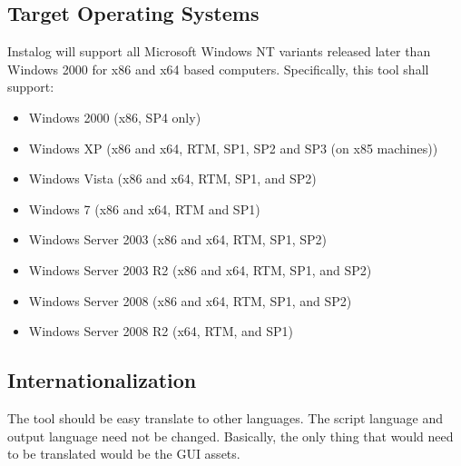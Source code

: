 \documentclass[letterpaper,12pt]{article}
\begin{document}
\subsection{Target Operating Systems}
Instalog will support all Microsoft Windows NT variants released later than
Windows 2000 for x86 and x64 based computers.  Specifically, this tool shall
support:
\begin{itemize}
  \item Windows 2000 (x86, SP4 only)
  \item Windows XP (x86 and x64, RTM, SP1, SP2 and SP3 (on x85 machines))
  \item Windows Vista (x86 and x64, RTM, SP1, and SP2)
  \item Windows 7 (x86 and x64, RTM and SP1)
  \item Windows Server 2003 (x86 and x64, RTM, SP1, SP2)
  \item Windows Server 2003 R2 (x86 and x64, RTM, SP1, and SP2)
  \item Windows Server 2008 (x86 and x64, RTM, SP1, and SP2)
  \item Windows Server 2008 R2 (x64, RTM, and SP1)
\end{itemize}

\subsection{Internationalization}
The tool should be easy translate to other languages.  The script language and
output language need not be changed.  Basically, the only thing that would need
to be translated would be the GUI assets.  

\newpage
\end{document}
